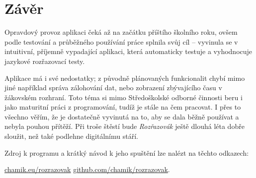 \chapter*{Závěr}

Opravdový provoz aplikaci čeká až na začátku příštího školního roku, ovšem podle testování a průběžného používání práce splnila svůj cíl -- vyvinula se v intuitivní, příjemně vypadající aplikaci, která automaticky testuje a vyhodnocuje jazykové rozřazovací testy. 

Aplikace má i své nedostatky; z původně plánovaných funkcionalit chybí mimo jiné například správa zálohování dat, nebo zobrazení zbývajícího času v žákovském rozhraní. Toto téma si mimo Středoškolské odborné činnosti beru i jako maturitní práci z programování, tudíž je stále na čem pracovat. I přes to všechno věřím, že je dostatečně vyvinutá na to, aby se dala běžně používat a nebyla pouhou přítěží. Při troše štěstí bude \textit{Rozřazovák} ještě dlouhá léta dobře sloužit, než také podlehne digitálnímu stáří.

Zdroj k programu a krátký návod k jeho spuštění lze nalézt na těchto odkazech:

\href{https://chamik.eu/rozrazovak}{chamik.eu/rozrazovak} \newline
\href{https://github.com/chamik/rozrazovak/}{github.com/chamik/rozrazovak}.